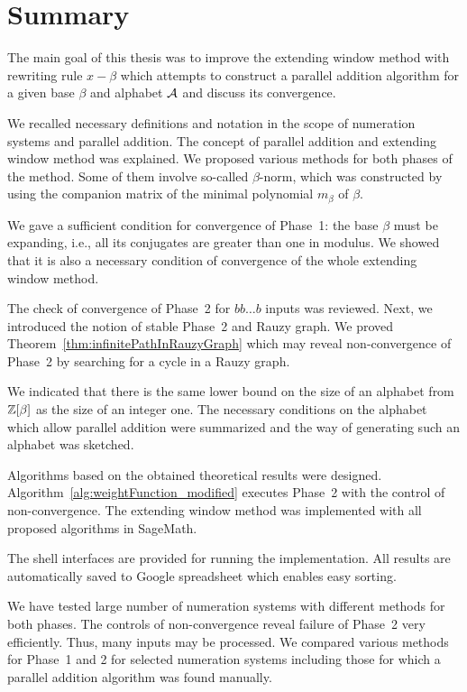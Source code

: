 \chapter*{\vspace{-30pt}Summary}
The main goal of this thesis was to improve the extending window method with rewriting rule $x-\beta$ which attempts to construct a parallel addition algorithm for a given base $\beta$ and alphabet $\mathcal{A}$ and discuss its convergence.

We  recalled necessary definitions and notation in the scope of numeration systems and parallel addition. The concept of parallel addition and extending  window method was explained. We proposed various methods for both phases of the method. Some of them involve so-called $\beta$-norm, which was constructed by using the companion matrix of the minimal polynomial $m_\beta$ of $\beta$.

We gave a sufficient condition for convergence of Phase~1: the base $\beta$ must be expanding, i.e., all its conjugates are greater than one in modulus. We showed that it is also a necessary condition of convergence of the whole extending window method. 

The check of convergence of Phase~2 for $bb\dots b$ inputs was reviewed. Next, we introduced the notion of stable Phase~2 and  Rauzy graph. We proved Theorem~\ref{thm:infinitePathInRauzyGraph} which may reveal non-convergence of Phase~2 by searching for a cycle in a Rauzy graph.

We indicated that there is the same lower bound on the size of an alphabet from $\mathbb{Z}[\beta]$ as the size of an integer one. The necessary conditions on the alphabet which allow parallel addition were summarized and the way of generating such an alphabet was sketched.

Algorithms based on the obtained theoretical results were designed. Algorithm~\ref{alg:weightFunction_modified} executes Phase~2 with the control of non-convergence. The extending window method was implemented with all proposed algorithms in SageMath.

The shell interfaces are provided for running the implementation. All results are automatically saved to Google spreadsheet which enables easy sorting.

We have tested large number of numeration systems with different methods for both phases. The controls of non-convergence reveal failure of Phase~2 very efficiently. Thus, many inputs may be processed. We compared various methods for Phase~1 and 2 for selected numeration systems including those for which a parallel addition algorithm was found manually.

